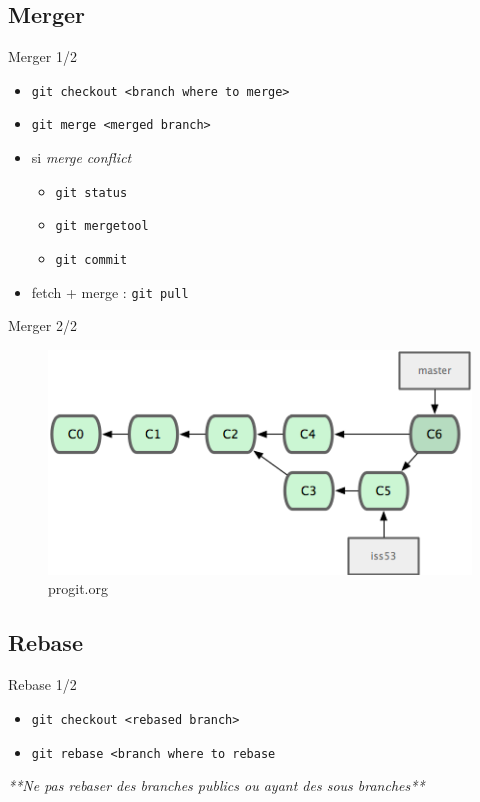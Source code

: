 \documentclass{beamer}
\begin{document}
\subsection*{Merger}
\begin{frame}{Merger 1/2}
  \begin{itemize}
  \item \lstinline|git checkout <branch where to merge>|
  \item \lstinline|git merge <merged branch>|
  \item si \emph{merge conflict}
    \begin{itemize}
    \item[]  \lstinline|git status|
    \item[]  \lstinline|git mergetool|
    \item[]  \lstinline|git commit|
    \end{itemize}
  \item fetch + merge : \lstinline|git pull|
  \end{itemize}
\end{frame}

\begin{frame}{Merger 2/2}
  \begin{figure}
    \begin{center}
      \includegraphics[scale=1]{img/Merge.png}
    \end{center}
    \caption{progit.org}
  \end{figure}
\end{frame}

\subsection*{Rebase}
\begin{frame}{Rebase 1/2}
  \begin{itemize}
  \item \lstinline|git checkout <rebased branch>|
  \item \lstinline|git rebase <branch where to rebase|
  \end{itemize}
  \emph{**Ne pas rebaser des branches publics 
    ou ayant des sous branches**}
  
\end{frame}
\end{document}
